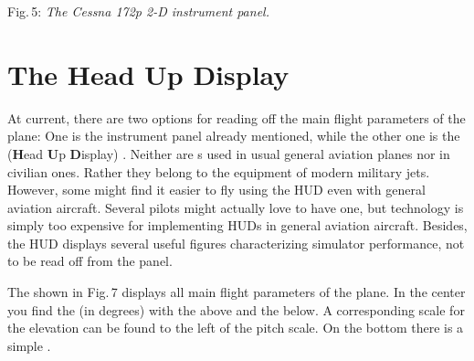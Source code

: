 \medskip

\centerline{}

\smallskip
 \noindent
Fig.\,5: \textit{The Cessna 172p 2-D instrument panel.}
\medskip

\section{The Head Up Display}

At current, there are two options for reading off the main flight parameters of
the
plane: One is the instrument panel already mentioned, while the other one is the
 (\textbf{H}ead \textbf{U}p \textbf{D}isplay) . Neither
are s used in usual general aviation planes nor in civilian ones.
Rather they
belong to the equipment of modern military jets. However, some might find it
easier to
fly using the HUD even with general aviation aircraft. Several 
pilots
might actually love to have one, but technology is simply too expensive for
implementing
HUDs in general aviation aircraft. Besides, the HUD displays several useful
figures
characterizing simulator performance, not to be read off from the panel.

The  shown in Fig.\,7  displays all main flight parameters of the
plane. In
the center you find the  (in degrees) with the
 above and the  below. A corresponding scale
for the
elevation can be found to the left of the pitch
scale. On the
bottom there is a simple .

